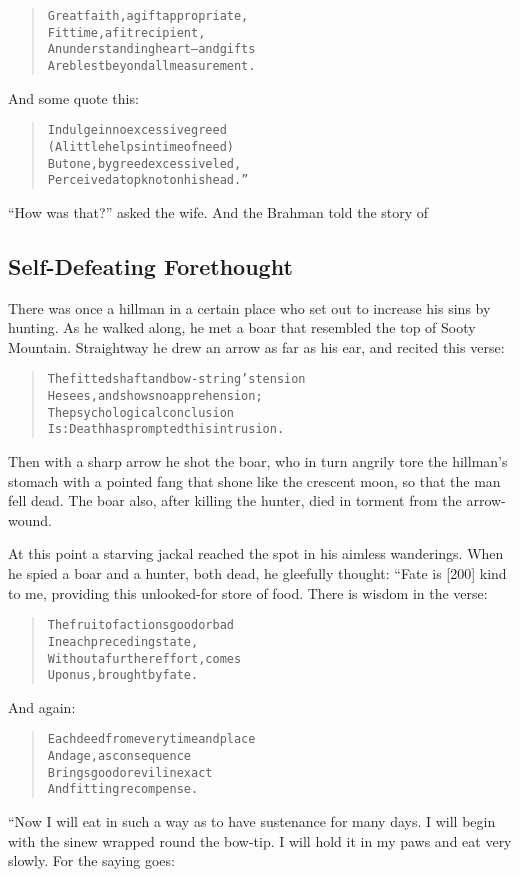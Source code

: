 \documentclass[article, twoside, 14pt]{memoir}
\renewenvironment{verbatim}{%
\begin{quote}%
\vskip -10pt%
\begin{alltt}\normalfont\large}{\end{alltt}%
\end{quote}%
\vskip -10pt
} %
\begin{document}
\begin{verbatim}
Great faith, a gift appropriate,
    Fit time, a fit recipient,
An understanding heart--and gifts
    Are blest beyond all measurement.
\end{verbatim}
And some quote this:

\begin{verbatim}
Indulge in no excessive greed
(A little helps in time of need)
But one, by greed excessive led,
Perceived a topknot on his head.”
\end{verbatim}
``How was that?'' asked the wife. And the Brahman told the story
of

\subsection{Self-Defeating Forethought}

\label{s40}

There was once a hillman in a certain place who set out to increase
his sins by hunting. As he walked along, he met a boar that
resembled the top of Sooty Mountain. Straightway he drew an arrow
as far as his ear, and recited this verse:

\begin{verbatim}
The fitted shaft and bow-string's tension
He sees, and shows no apprehension;
The psychological conclusion
Is: Death has prompted this intrusion.
\end{verbatim}
Then with a sharp arrow he shot the boar, who in turn angrily tore
the hillman's stomach with a pointed fang that shone like the
crescent moon, so that the man fell dead. The boar also, after
killing the hunter, died in torment from the arrow-wound.

At this point a starving jackal reached the spot in his aimless
wanderings. When he spied a boar and a hunter, both dead, he
gleefully thought: “Fate is [200] kind to me, providing this
unlooked-for store of food. There is wisdom in the verse:

\begin{verbatim}
The fruit of actions good or bad
    In each preceding state,
Without a further effort, comes
    Upon us, brought by fate.
\end{verbatim}
And again:

\begin{verbatim}
Each deed from every time and place
    And age, as consequence
Brings good or evil in exact
    And fitting recompense.
\end{verbatim}
“Now I will eat in such a way as to have sustenance for many days.
I will begin with the sinew wrapped round the bow-tip. I will hold
it in my paws and eat very slowly. For the saying goes:
\end{document}
